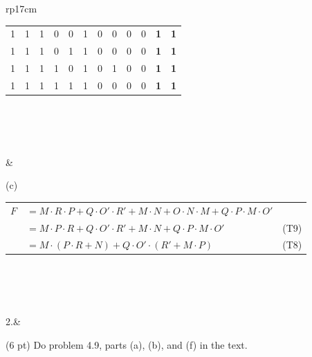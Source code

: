 \documentclass{article}
\begin{document}
\begin{longtable}[l]{rp{17cm}}
\begin{minipage}[t]{\linewidth}
\begin{tabular}{ccccc|ccccc|cc}
   1  &  1  &  1  &  0  &  0  &  1  &  0  &  0  &  0  &  0  & \textbf{ 1 } & \textbf{ 1 }\\
   1  &  1  &  1  &  0  &  1  &  1  &  0  &  0  &  0  &  0  & \textbf{ 1 } & \textbf{ 1 }\\
   1  &  1  &  1  &  1  &  0  &  1  &  0  &  1  &  0  &  0  & \textbf{ 1 } & \textbf{ 1 }\\
   1  &  1  &  1  &  1  &  1  &  1  &  0  &  0  &  0  &  0  & \textbf{ 1 } & \textbf{ 1 }\\
\end{tabular}\\ \\
\end{minipage}\\
&\begin{minipage}[t]{\linewidth}
(c)\\
\begin{tabular}{rll}
  $F$ & $=M \cdot R \cdot P + Q \cdot O' \cdot R' + M \cdot N + O \cdot N \cdot M + Q \cdot P \cdot M \cdot O'$ &\\
      & $=M \cdot P \cdot R + Q \cdot O' \cdot R' + M \cdot N + Q \cdot P \cdot M \cdot O'$ & (T9)\\
      & $=M \cdot (P \cdot R + N) + Q \cdot O' \cdot (R' + M \cdot P)$ & (T8)\\
\end{tabular}\\ \\
\end{minipage}\\
\medskip
2.&\begin{minipage}[t]{\linewidth}(6 pt) Do problem 4.9, parts (a), (b), and (f) in the text.\\ \\


\end{minipage}
\end{longtable}
\end{document}
